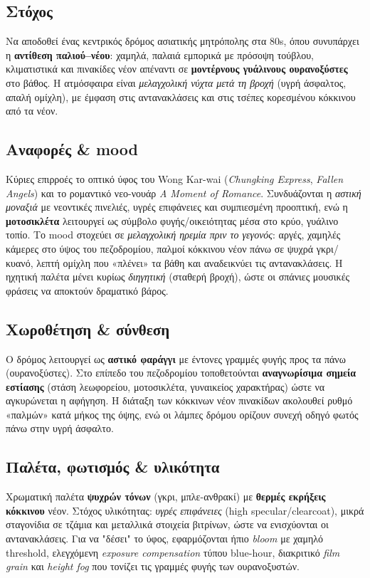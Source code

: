 \subsection*{Στόχος}
Να αποδοθεί ένας κεντρικός δρόμος ασιατικής μητρόπολης στα 80s, όπου συνυπάρχει η \textbf{αντίθεση παλιού–νέου}: χαμηλά, παλαιά εμπορικά με πρόσοψη τούβλου, κλιματιστικά και πινακίδες νέον απέναντι σε \textbf{μοντέρνους γυάλινους ουρανοξύστες} στο βάθος. Η ατμόσφαιρα είναι \textit{μελαγχολική νύχτα μετά τη βροχή} (υγρή άσφαλτος, απαλή ομίχλη), με έμφαση στις αντανακλάσεις και στις τσέπες κορεσμένου κόκκινου από τα νέον.

\subsection*{Αναφορές \& mood}
Κύριες επιρροές το οπτικό ύφος του Wong Kar-wai (\textit{Chungking Express}, \textit{Fallen Angels}) και το ρομαντικό νεο-νουάρ \textit{A Moment of Romance}. Συνδυάζονται η \textit{αστική μοναξιά} με νεοντικές πινελιές, υγρές επιφάνειες και συμπιεσμένη προοπτική, ενώ η \textbf{μοτοσικλέτα} λειτουργεί ως σύμβολο φυγής/οικειότητας μέσα στο κρύο, γυάλινο τοπίο. Το mood στοχεύει σε \textit{μελαγχολική ηρεμία πριν το γεγονός}: αργές, χαμηλές κάμερες στο ύψος του πεζοδρομίου, παλμοί κόκκινου νέον πάνω σε ψυχρά γκρι/κυανό, λεπτή ομίχλη που «πλένει» τα βάθη και αναδεικνύει τις αντανακλάσεις. Η ηχητική παλέτα μένει κυρίως \textit{διηγητική} (σταθερή βροχή), ώστε οι σπάνιες μουσικές φράσεις να αποκτούν δραματικό βάρος.

\subsection*{Χωροθέτηση \& σύνθεση}
Ο δρόμος λειτουργεί ως \textbf{αστικό φαράγγι} με έντονες γραμμές φυγής προς τα πάνω (ουρανοξύστες). Στο επίπεδο του πεζοδρομίου τοποθετούνται \textbf{αναγνωρίσιμα σημεία εστίασης} (στάση λεωφορείου, μοτοσικλέτα, γυναικείος χαρακτήρας) ώστε να αγκυρώνεται η αφήγηση. Η διάταξη των κόκκινων νέον πινακίδων ακολουθεί ρυθμό «παλμών» κατά μήκος της όψης, ενώ οι λάμπες δρόμου ορίζουν συνεχή οδηγό φωτός πάνω στην υγρή άσφαλτο.

\subsection*{Παλέτα, φωτισμός \& υλικότητα}
Χρωματική παλέτα \textbf{ψυχρών τόνων} (γκρι, μπλε-ανθρακί) με \textbf{θερμές εκρήξεις κόκκινου} νέον. Στόχος υλικότητας: \textit{υγρές επιφάνειες} (high specular/clearcoat), μικρά σταγονίδια σε τζάμια και μεταλλικά στοιχεία βιτρίνων, ώστε να ενισχύονται οι αντανακλάσεις. Για να "δέσει" το ύφος, εφαρμόζονται ήπιο \textit{bloom} με χαμηλό threshold, ελεγχόμενη \textit{exposure compensation} τύπου blue-hour, διακριτικό \textit{film grain} και \textit{height fog} που τονίζει τις γραμμές φυγής των ουρανοξυστών.

